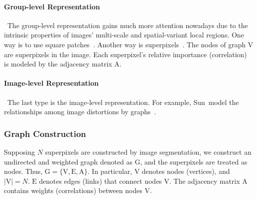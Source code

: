\paragraph{Group-level Representation}~The group-level representation gains much more attention nowadays due to the intrinsic properties of images' multi-scale and spatial-variant local regions. One way is to use square patches~\citep{dosovitskiy2020image, liu2021swin}. Another way is superpixels~\citep{Giraldo2022Graph}. The nodes of graph $\boldsymbol{\mathrm{V}}$ are superpixels in the image. Each superpixel's relative importance (correlation) is modeled by the adjacency matrix $\boldsymbol{\mathrm{A}}$.

\paragraph{Image-level Representation}~The last type is the image-level representation. For example, Sun~\etal model the relationships among image distortions by graphs~\citep{sun2022graphiqa}.

\subsubsection{Graph Construction}
Supposing $N$ superpixels are constructed by image segmentation, we construct an undirected and weighted graph denoted as $\boldsymbol{\mathrm{G}}$, and the superpixels are treated as nodes. Thus, $\boldsymbol{\mathrm{G}}=\{\boldsymbol{\mathrm{V}}, \boldsymbol{\mathrm{E}}, \boldsymbol{\mathrm{A}}\}$. In particular, $\boldsymbol{\mathrm{V}}$ denotes nodes (vertices), and $|\boldsymbol{\mathrm{V}}|=N$. $\boldsymbol{\mathrm{E}}$ denotes edges (links) that connect nodes $\boldsymbol{\mathrm{V}}$. The adjacency matrix $\boldsymbol{\mathrm{A}}$ contains weights (correlations) between nodes $\boldsymbol{\mathrm{V}}$.

